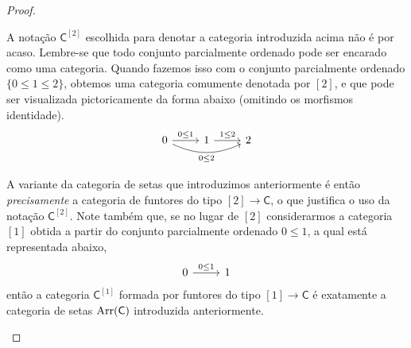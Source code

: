 \begin{proof}
  \begin{obs}
    A notação $\mathsf{C}^{[2]}$ escolhida para denotar a categoria introduzida acima não é por acaso.
    Lembre-se que todo conjunto parcialmente ordenado pode ser encarado como uma categoria.
    Quando fazemos isso com o conjunto parcialmente ordenado $\{0 \leq 1 \leq 2\}$, obtemos uma categoria comumente denotada por $[2]$, e que pode ser visualizada pictoricamente da forma abaixo (omitindo os morfismos identidade).
    \begin{displaymath}
      \begin{tikzcd}
        0
        \arrow[r, "0 \leq 1"]
        \arrow[rr, bend right=25, "0 \leq 2" swap]
        & 1
        \arrow[r, "1 \leq 2"]
        & 2      
      \end{tikzcd}
    \end{displaymath}
  
    A variante da categoria de setas que introduzimos anteriormente é então \emph{precisamente} a categoria de funtores do tipo $[2] \to \mathsf{C}$, o que justifica o uso da notação $\mathsf{C}^{[2]}$.
    Note também que, se no lugar de $[2]$ considerarmos a categoria $[1]$ obtida a partir do conjunto parcialmente ordenado $0 \leq 1$, a qual está representada abaixo,
    \begin{displaymath}
      \begin{tikzcd}
        0
        \arrow[r, "0 \leq 1"]
        & 1
      \end{tikzcd}
    \end{displaymath}
    então a categoria $\mathsf{C}^{[1]}$ formada por funtores do tipo $[1] \to \mathsf{C}$ é exatamente a categoria de setas $\mathrm{Arr}(\mathsf{C})$ introduzida anteriormente.
  \end{obs}
  

\end{proof}
